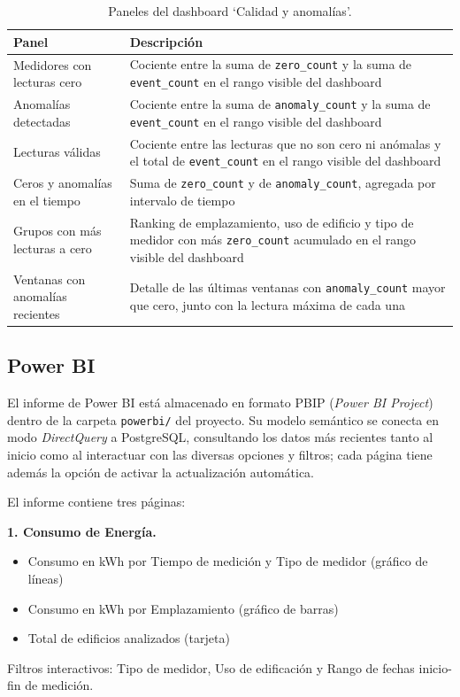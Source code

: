 \begin{table}[H]
  \centering
  \begin{tabular}{|p{4.5cm}|p{9cm}|}
    \hline
    \textbf{Panel} & \textbf{Descripción} \\ \hline
    Medidores con lecturas cero & Cociente entre la suma de \texttt{zero\_count} y la suma de \texttt{event\_count} en el rango visible del dashboard \\ \hline
    Anomalías detectadas & Cociente entre la suma de \texttt{anomaly\_count} y la suma de \texttt{event\_count} en el rango visible del dashboard \\ \hline
    Lecturas válidas & Cociente entre las lecturas que no son cero ni anómalas y el total de \texttt{event\_count} en el rango visible del dashboard \\ \hline
    Ceros y anomalías en el tiempo & Suma de \texttt{zero\_count} y de \texttt{anomaly\_count}, agregada por intervalo de tiempo \\ \hline
    Grupos con más lecturas a cero & Ranking de emplazamiento, uso de edificio y tipo de medidor con más \texttt{zero\_count} acumulado en el rango visible del dashboard \\ \hline
    Ventanas con anomalías recientes & Detalle de las últimas ventanas con \texttt{anomaly\_count} mayor que cero, junto con la lectura máxima de cada una \\ \hline
  \end{tabular}
  \caption{Paneles del dashboard `Calidad y anomalías'.}
  \label{tab:grafana-calidad}
\end{table}

\subsection{Power BI}
\label{sec:powerbi}

El informe de Power BI está almacenado en formato PBIP (\textit{Power BI Project}) dentro de la carpeta \texttt{powerbi/} del proyecto. Su modelo semántico se conecta en modo \textit{DirectQuery} a PostgreSQL, consultando los datos más recientes tanto al inicio como al interactuar con las diversas opciones y filtros; cada página tiene además la opción de activar la actualización automática.

El informe contiene tres páginas:

\textbf{1. Consumo de Energía.}
\begin{itemize}
  \item Consumo en kWh por Tiempo de medición y Tipo de medidor (gráfico de líneas)
  \item Consumo en kWh por Emplazamiento (gráfico de barras)
  \item Total de edificios analizados (tarjeta)
\end{itemize}
Filtros interactivos: Tipo de medidor, Uso de edificación y Rango de fechas inicio-fin de medición.

